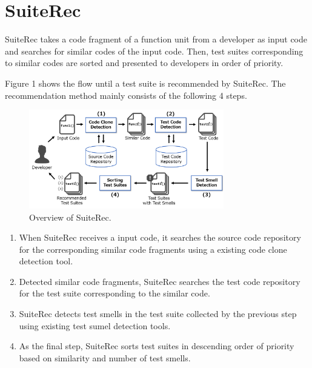 \documentclass[conference]{IEEEtran}
\begin{document}
\section{SuiteRec}
SuiteRec takes a code fragment of a function unit from a developer as input code and searches for similar codes of the input code. Then, test suites corresponding to similar codes are sorted and presented to developers in order of priority.

Figure 1 shows the flow until a test suite is recommended by SuiteRec. The recommendation method mainly consists of the following 4 steps.

\begin{figure}[htbp]
\centerline{\includegraphics[width=8.5cm]{SuiteRec-outline.pdf}}
\caption{Overview of SuiteRec.}
\label{fig}
\end{figure}

\begin{enumerate}
\renewcommand{\labelenumi}{(\arabic{enumi})}
\item When SuiteRec receives a input code, it searches the source code repository for the corresponding similar code fragments using a existing code clone detection tool.
\item Detected similar code fragments, SuiteRec searches the test code repository for the test suite corresponding to the similar code.
\item SuiteRec detects test smells in the test suite collected by the previous step using existing test sumel detection tools.
\item As the final step, SuiteRec sorts test suites in descending order of priority based on similarity and number of test smells.
\end{enumerate}
\end{document}
